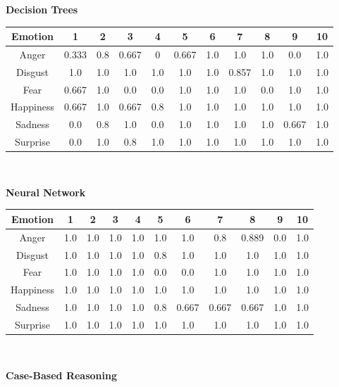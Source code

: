 \documentclass[a4paper]{article}
\begin{document}
{\bf Decision Trees}\\

\begin{center}
  \begin{tabular}{|c|cccccccccc|}
  \hline
    Emotion & 1 & 2 & 3 & 4 & 5 & 6 & 7 & 8 & 9 & 10 \\
    \hline
    Anger 	& 0.333 & 0.8 & 0.667 & 0 & 0.667 & 1.0 & 1.0 & 1.0 & 0.0 & 1.0 \\
	Disgust & 1.0 & 1.0 & 1.0 & 1.0 & 1.0 & 1.0 & 0.857 & 1.0 & 1.0 & 1.0 \\
	Fear 	& 0.667 & 1.0 & 0.0 & 0.0 & 1.0 & 1.0 & 1.0 & 0.0 & 1.0 & 1.0 \\
	Happiness 	& 0.667 & 1.0 & 0.667 & 0.8 & 1.0 & 1.0 & 1.0 & 1.0 & 1.0 & 1.0 \\
	Sadness 	& 0.0 & 0.8 & 1.0 & 0.0 & 1.0 & 1.0 & 1.0 & 1.0 & 0.667 & 1.0 \\
	Surprise 	& 0.0 & 1.0 & 0.8 & 1.0 & 1.0 & 1.0 & 1.0 & 1.0 & 1.0 & 1.0 \\
	\hline
  \end{tabular}\\
  \end{center}
  
 {\bf Neural Network}\\

\begin{center}
  \begin{tabular}{|c|cccccccccc|}
  \hline
    Emotion & 1 & 2 & 3 & 4 & 5 & 6 & 7 & 8 & 9 & 10 \\
    \hline
    Anger 	& 1.0 & 1.0 & 1.0 & 1.0 & 1.0 & 1.0 & 0.8 & 0.889 & 0.0 & 1.0 \\
	Disgust & 1.0 & 1.0 & 1.0 & 1.0 & 0.8 & 1.0 & 1.0 & 1.0 & 1.0 & 1.0 \\
	Fear 	& 1.0 & 1.0 & 1.0 & 1.0 & 0.0 & 0.0 & 1.0 & 1.0 & 1.0 & 1.0 \\
	Happiness 	& 1.0 & 1.0 & 1.0 & 1.0 & 1.0 & 1.0 & 1.0 & 1.0 & 1.0 & 1.0 \\
	Sadness 	& 1.0 & 1.0 & 1.0 & 1.0 & 0.8 & 0.667 & 0.667 & 0.667 & 1.0 & 1.0 \\
	Surprise 	& 1.0 & 1.0 & 1.0 & 1.0 & 1.0 & 1.0 & 1.0 & 1.0 & 1.0 & 1.0 \\
	\hline
  \end{tabular}\\
  \end{center}
  
  {\bf Case-Based Reasoning}\\
\end{document}
